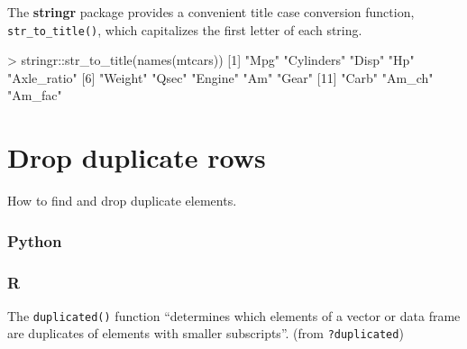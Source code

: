 \documentclass[
]{book}
\newenvironment{Shaded}{\begin{snugshade}}{\end{snugshade}}
\newcommand{\DecValTok}[1]{\textcolor[rgb]{0.00,0.00,0.81}{#1}}
\newcommand{\FunctionTok}[1]{\textcolor[rgb]{0.00,0.00,0.00}{#1}}
\newcommand{\NormalTok}[1]{#1}
\newcommand{\SpecialCharTok}[1]{\textcolor[rgb]{0.00,0.00,0.00}{#1}}
\newcommand{\StringTok}[1]{\textcolor[rgb]{0.31,0.60,0.02}{#1}}
\begin{document}
The \textbf{stringr} package provides a convenient title case conversion function, \texttt{str\_to\_title()}, which capitalizes the first letter of each string.

\begin{Shaded}
\begin{Highlighting}[]
\SpecialCharTok{\textgreater{}}\NormalTok{ stringr}\SpecialCharTok{::}\FunctionTok{str\_to\_title}\NormalTok{(}\FunctionTok{names}\NormalTok{(mtcars))}
\NormalTok{ [}\DecValTok{1}\NormalTok{] }\StringTok{"Mpg"}        \StringTok{"Cylinders"}  \StringTok{"Disp"}       \StringTok{"Hp"}         \StringTok{"Axle\_ratio"}
\NormalTok{ [}\DecValTok{6}\NormalTok{] }\StringTok{"Weight"}     \StringTok{"Qsec"}       \StringTok{"Engine"}     \StringTok{"Am"}         \StringTok{"Gear"}      
\NormalTok{[}\DecValTok{11}\NormalTok{] }\StringTok{"Carb"}       \StringTok{"Am\_ch"}      \StringTok{"Am\_fac"}    
\end{Highlighting}
\end{Shaded}

\hypertarget{drop-duplicate-rows}{%
\section{Drop duplicate rows}\label{drop-duplicate-rows}}

How to find and drop duplicate elements.

\hypertarget{python-21}{%
\subsubsection*{Python}\label{python-21}}

\hypertarget{r-21}{%
\subsubsection*{R}\label{r-21}}

The \texttt{duplicated()} function ``determines which elements of a vector or data frame are duplicates of elements with smaller subscripts''. (from \texttt{?duplicated})
\end{document}
